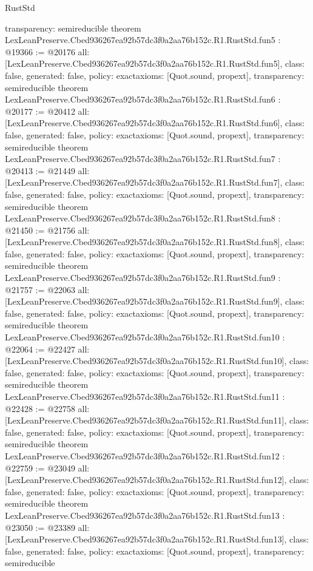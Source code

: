 \begin{lexlean}{RustStd}
\begin{coremodule}
{  transparency: semireducible
}
theorem LexLeanPreserve.Cbed936267ea92b57dc3f0a2aa76b152c.R1.RustStd.fun5 : @19366 := @20176 {
  all: [LexLeanPreserve.Cbed936267ea92b57dc3f0a2aa76b152c.R1.RustStd.fun5],
  class: false,
  generated: false,
  policy: exact{axioms: [Quot.sound, propext]},
  transparency: semireducible
}
theorem LexLeanPreserve.Cbed936267ea92b57dc3f0a2aa76b152c.R1.RustStd.fun6 : @20177 := @20412 {
  all: [LexLeanPreserve.Cbed936267ea92b57dc3f0a2aa76b152c.R1.RustStd.fun6],
  class: false,
  generated: false,
  policy: exact{axioms: [Quot.sound, propext]},
  transparency: semireducible
}
theorem LexLeanPreserve.Cbed936267ea92b57dc3f0a2aa76b152c.R1.RustStd.fun7 : @20413 := @21449 {
  all: [LexLeanPreserve.Cbed936267ea92b57dc3f0a2aa76b152c.R1.RustStd.fun7],
  class: false,
  generated: false,
  policy: exact{axioms: [Quot.sound, propext]},
  transparency: semireducible
}
theorem LexLeanPreserve.Cbed936267ea92b57dc3f0a2aa76b152c.R1.RustStd.fun8 : @21450 := @21756 {
  all: [LexLeanPreserve.Cbed936267ea92b57dc3f0a2aa76b152c.R1.RustStd.fun8],
  class: false,
  generated: false,
  policy: exact{axioms: [Quot.sound, propext]},
  transparency: semireducible
}
theorem LexLeanPreserve.Cbed936267ea92b57dc3f0a2aa76b152c.R1.RustStd.fun9 : @21757 := @22063 {
  all: [LexLeanPreserve.Cbed936267ea92b57dc3f0a2aa76b152c.R1.RustStd.fun9],
  class: false,
  generated: false,
  policy: exact{axioms: [Quot.sound, propext]},
  transparency: semireducible
}
theorem LexLeanPreserve.Cbed936267ea92b57dc3f0a2aa76b152c.R1.RustStd.fun10 : @22064 := @22427 {
  all: [LexLeanPreserve.Cbed936267ea92b57dc3f0a2aa76b152c.R1.RustStd.fun10],
  class: false,
  generated: false,
  policy: exact{axioms: [Quot.sound, propext]},
  transparency: semireducible
}
theorem LexLeanPreserve.Cbed936267ea92b57dc3f0a2aa76b152c.R1.RustStd.fun11 : @22428 := @22758 {
  all: [LexLeanPreserve.Cbed936267ea92b57dc3f0a2aa76b152c.R1.RustStd.fun11],
  class: false,
  generated: false,
  policy: exact{axioms: [Quot.sound, propext]},
  transparency: semireducible
}
theorem LexLeanPreserve.Cbed936267ea92b57dc3f0a2aa76b152c.R1.RustStd.fun12 : @22759 := @23049 {
  all: [LexLeanPreserve.Cbed936267ea92b57dc3f0a2aa76b152c.R1.RustStd.fun12],
  class: false,
  generated: false,
  policy: exact{axioms: [Quot.sound, propext]},
  transparency: semireducible
}
theorem LexLeanPreserve.Cbed936267ea92b57dc3f0a2aa76b152c.R1.RustStd.fun13 : @23050 := @23389 {
  all: [LexLeanPreserve.Cbed936267ea92b57dc3f0a2aa76b152c.R1.RustStd.fun13],
  class: false,
  generated: false,
  policy: exact{axioms: [Quot.sound, propext]},
  transparency: semireducible
}
\end{coremodule}
\end{lexlean}
